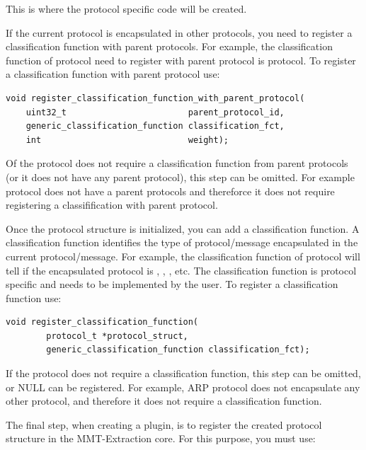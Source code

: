 This is where the protocol specific code will be created. 

If the current protocol is encapsulated in other protocols, you need to register a classification function with parent protocols. For example, the classification function of  protocol need to register with parent protocol is  protocol. To register a classification function with parent protocol use:

\begin{lstlisting}[style=Cpp]
void register_classification_function_with_parent_protocol(
    uint32_t                        parent_protocol_id, 
    generic_classification_function classification_fct,
    int                             weight);
\end{lstlisting}

Of the protocol does not require a classification function from parent protocols (or it does not have any parent protocol), this step can be omitted. For example  protocol does not have a parent protocols and thereforce it does not require registering a classifification with parent protocol.

Once the protocol structure is initialized, you can add a classification function. A classification function identifies the type of protocol/message encapsulated in the current protocol/message. For example, the classification function of  protocol will tell if the encapsulated protocol is , , , etc. The classification function is protocol specific and needs to be implemented by the user. To register a classification function use:

\begin{lstlisting}[style=Cpp]
void register_classification_function(
        protocol_t *protocol_struct, 
        generic_classification_function classification_fct);
\end{lstlisting}

If the protocol does not require a classification function, this step can be omitted, or NULL can be registered. For example, ARP protocol does not encapsulate any other protocol, and therefore it does not require a classification function.

The final step, when creating a plugin, is to register the created protocol structure in the MMT-Extraction core. For this purpose, you must use:

